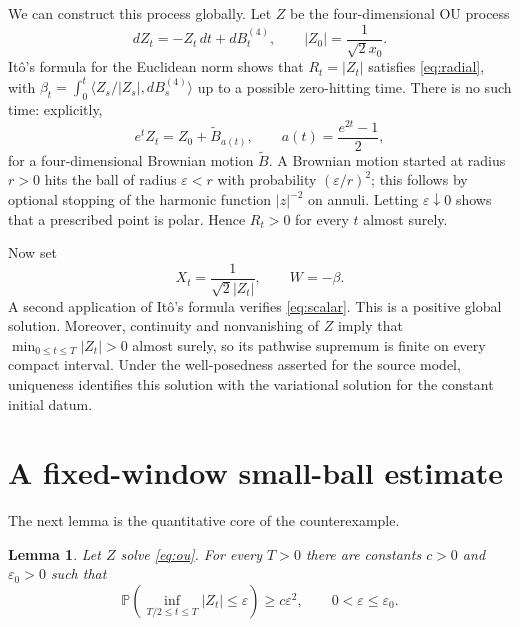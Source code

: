 \documentclass[10pt]{article}
\newtheorem{lemma}{Lemma}
\newcommand{\Pp}{\mathbb P}
\newcommand{\1}{\mathbf 1}
\begin{document}
We can construct this process globally.  Let $Z$ be the four-dimensional OU
process
\begin{equation}\label{eq:ou}
 dZ_t=-Z_t\,dt+dB_t^{(4)},\qquad
 |Z_0|=\frac{1}{\sqrt2 x_0}.
\end{equation}
It\^o's formula for the Euclidean norm shows that $R_t=|Z_t|$ satisfies
\eqref{eq:radial}, with
$\beta_t=\int_0^t \langle Z_s/|Z_s|,dB_s^{(4)}\rangle$ up to a possible
zero-hitting time.  There is no such time: explicitly,
\[
 e^t Z_t=Z_0+\widetilde B_{a(t)},
 \qquad a(t)=\frac{e^{2t}-1}{2},
\]
for a four-dimensional Brownian motion $\widetilde B$.  A Brownian motion
started at radius $r>0$ hits the ball of radius $\varepsilon<r$ with
probability $(\varepsilon/r)^2$; this follows by optional stopping of the
harmonic function $|z|^{-2}$ on annuli.  Letting $\varepsilon\downarrow0$
shows that a prescribed point is polar.  Hence $R_t>0$ for every $t$ almost
surely.

Now set
\begin{equation}\label{eq:reciprocal}
 X_t=\frac{1}{\sqrt2|Z_t|},\qquad W=-\beta.
\end{equation}
A second application of It\^o's formula verifies \eqref{eq:scalar}.  This is a
positive global solution.  Moreover, continuity and nonvanishing of $Z$ imply
that $\min_{0\le t\le T}|Z_t|>0$ almost surely, so its pathwise supremum is
finite on every compact interval.  Under the well-posedness asserted for the
source model, uniqueness identifies this solution with the variational
solution for the constant initial datum.

\section{A fixed-window small-ball estimate}

The next lemma is the quantitative core of the counterexample.

\begin{lemma}\label{lem:hit}
Let $Z$ solve \eqref{eq:ou}.  For every $T>0$ there are constants
$c>0$ and $\varepsilon_0>0$ such that
\[
 \Pp\!\left(\inf_{T/2\le t\le T}|Z_t|\le\varepsilon\right)
 \ge c\varepsilon^2,
 \qquad 0<\varepsilon\le\varepsilon_0.
\]
\end{lemma}
\end{document}

